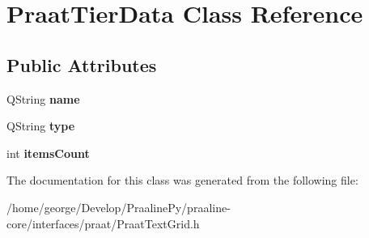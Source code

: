 \hypertarget{class_praat_tier_data}{}\section{Praat\+Tier\+Data Class Reference}
\label{class_praat_tier_data}
\subsection*{Public Attributes}
\begin{DoxyCompactItemize}
\item 
\mbox{\label{class_praat_tier_data_ad6684ffe60b20fc66a7c4d99e12ce058}} 
Q\+String {\bfseries name}
\item 
\mbox{\label{class_praat_tier_data_afbd4893679c32dfe9fca2912c3733fe3}} 
Q\+String {\bfseries type}
\item 
\mbox{\label{class_praat_tier_data_ac3b309b0c455261a18df658bd6692471}} 
int {\bfseries items\+Count}
\end{DoxyCompactItemize}


The documentation for this class was generated from the following file\+:\begin{DoxyCompactItemize}
\item 
/home/george/\+Develop/\+Praaline\+Py/praaline-\/core/interfaces/praat/Praat\+Text\+Grid.\+h\end{DoxyCompactItemize}
